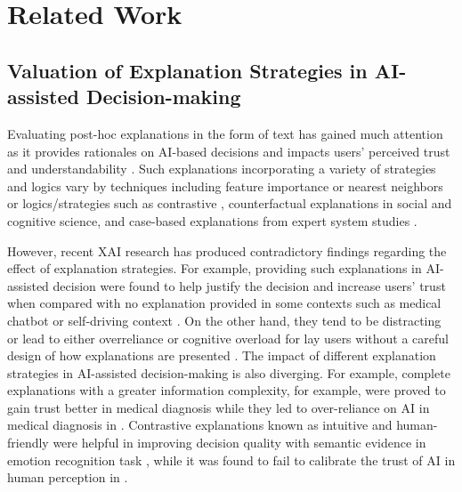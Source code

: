 \section{Related Work}
\label{sec:related-work}

\subsection{Valuation of Explanation Strategies in AI-assisted Decision-making}
\label{sec:related-work-exp}

Evaluating post-hoc explanations in the form of text has gained much attention as it provides rationales on AI-based decisions and impacts users' perceived trust and understandability  \cite{vilone2020explainable, lipton2018mythos, ExplainableSoftwareAnalytics}. Such explanations incorporating a variety of strategies and logics vary by techniques \cite{AreExplanationsHelpfulComparative, adhikari2019leafage} including feature importance or nearest neighbors or logics/strategies such as contrastive \cite{miller2019explanation, ConversationalProcessesCausalExplanation, DeductiveApproachCausalInference}, counterfactual \cite{Contrastscounterfactualscauses, CounterfactualStoryReasoningGeneration, CounterfactualExplanationsOpeningBlack, PsychologicalStudiesCausalCounterfactualReasoning} explanations in social and cognitive science, and case-based explanations from expert system studies \cite{Similaritymeasuresattributeselectioncasebased, GainingInsightCasebasedExplanation, EvaluationUsefulnessCaseBasedExplanation, SurveyCBRApplicationAreas}. 

However, recent XAI research has produced contradictory findings regarding the effect of explanation strategies. For example, providing such explanations in AI-assisted decision were found to help justify the decision and increase users' trust when compared with no explanation provided in some contexts such as medical chatbot \cite{ExploringPromotingDiagnosticTransparency} or self-driving context \cite{TrustingXAIEffectsdifferenttypes}. On the other hand, they tend to be distracting or lead to either overreliance \cite{ExplanationsCanReduceOverrelianceAI, PartneringPeopleDeepLearning} or cognitive overload \cite{WaitWhyAssessingBehaviorExplanation, EvolutionCognitiveLoadTheoryMeasurement} for lay users without a careful design of how explanations are presented \cite{CheXplainEnablingPhysiciansExploreUnderstand}. 
The impact of different explanation strategies in AI-assisted decision-making is also diverging. For example, complete explanations with a greater information complexity, for example, were proved to gain trust better in medical diagnosis \cite{EffectExplanationStylesUser, TooMuchTooLittlea, HowMuchInformationEffects} while they led to over-reliance on AI in medical diagnosis in \cite{RoleExplanationsTrustReliance}. Contrastive explanations known as intuitive and human-friendly were helpful in improving decision quality with semantic evidence in emotion recognition task \cite{RelatableExplainableAIPerceptualProcess}, while it was found to fail to calibrate the trust of AI in human perception in \cite{AreExplanationsHelpfulComparative}.

